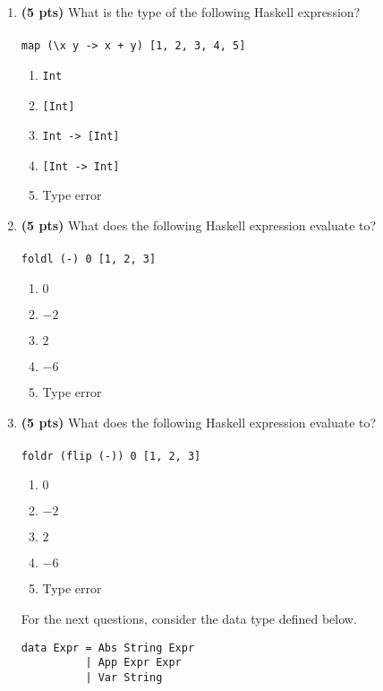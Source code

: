 \documentclass[paper=letter, fontsize=13pt]{article} %
\numberwithin{equation}{section} %
\begin{document}
\begin{enumerate}
\newpage
{}
\bigskip
\bigskip
\bigskip
\item \textbf{(5 pts)} What is the type of the following Haskell expression? \\\\
  \verb|map (\x y -> x + y) [1, 2, 3, 4, 5]|
  \begin{enumerate}[label=(\alph*), itemsep=1em]
  \item \verb|Int|
  \item \verb|[Int]|
  \item \verb|Int -> [Int]|
  \item \verb|[Int -> Int]|
  \item Type error
  \end{enumerate}

\item \textbf{(5 pts)} What does the following Haskell expression evaluate to? \\\\
  \verb|foldl (-) 0 [1, 2, 3]|
  \begin{enumerate}[label=(\alph*), itemsep=1em]
  \item $0$
  \item $-2$
  \item $2$
  \item $-6$  %
  \item Type error
  \end{enumerate}

\item \textbf{(5 pts)} What does the following Haskell expression evaluate to? \\\\
  \verb|foldr (flip (-)) 0 [1, 2, 3]|
  \begin{enumerate}[label=(\alph*), itemsep=1em]
  \item $0$
  \item $-2$
  \item $2$
  \item $-6$     %
  \item Type error
  \end{enumerate}

\newpage
\bigskip
\bigskip
\bigskip
\bigskip
\bigskip
\bigskip
\bigskip
\bigskip
\bigskip
\bigskip
\bigskip
For the next questions, consider the data type defined below.
\begin{lstlisting}
data Expr = Abs String Expr
          | App Expr Expr
          | Var String
\end{lstlisting}


\end{enumerate}
\end{document}
